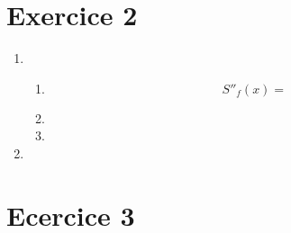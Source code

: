 \documentclass{article}
\begin{document}
\section*{Exercice 2}

\begin{enumerate}

\item

  \begin{enumerate}

  \item

    \begin{equation*}
      S''_f(x) = 
    \end{equation*}

  \item

  \item

  \end{enumerate}

\item 
  
\end{enumerate}

\section*{Ecercice 3}
\end{document}
